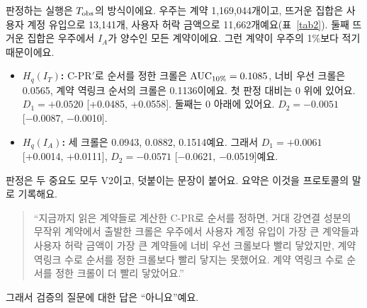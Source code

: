 판정하는 실행은 $T_{\mathrm{obs}}$의 \both{} 방식이에요. 우주는 계약 1,169,044개이고, 뜨거운 집합은 사용자 계정 유입으로 13,141개, 사용자 허락 금액으로 11,662개예요(표~\ref{tab2}). 둘째 뜨거운 집합은 우주에서 $I_A$가 양수인 모든 계약이에요. 그런 계약이 우주의 1\%보다 적기 때문이에요.
\begin{itemize}
\item \textbf{$H_q(I_T)$:} C-PR$'$로 순서를 정한 크롤은 $\mathrm{AUC}_{10\%}=0.1085$, 너비 우선 크롤은 0.0565, 계약 역링크 순서의 크롤은 0.1136이에요. 첫 판정 대비는 0 위에 있어요. $D_1=+0.0520$ [+0.0485, +0.0558]. 둘째는 0 아래에 있어요. $D_2=-0.0051$ [−0.0087, −0.0010].
\item \textbf{$H_q(I_A)$:} 세 크롤은 0.0943, 0.0882, 0.1514예요. 그래서 $D_1=+0.0061$ [+0.0014, +0.0111], $D_2=-0.0571$ [−0.0621, −0.0519]예요.
\end{itemize}
판정은 두 중요도 모두 V2이고, 덧붙이는 문장이 붙어요. 요약은 이것을 프로토콜의 말로 기록해요.

\begin{quote}
“지금까지 읽은 계약들로 계산한 C-PR로 순서를 정하면, 거대 강연결 성분의 무작위 계약에서 출발한 크롤은 우주에서 사용자 계정 유입이 가장 큰 계약들과 사용자 허락 금액이 가장 큰 계약들에 너비 우선 크롤보다 빨리 닿았지만, 계약 역링크 수로 순서를 정한 크롤보다 빨리 닿지는 못했어요. 계약 역링크 수로 순서를 정한 크롤이 더 빨리 닿았어요.”
\end{quote}
그래서 검증의 질문에 대한 답은 “아니요”예요.

